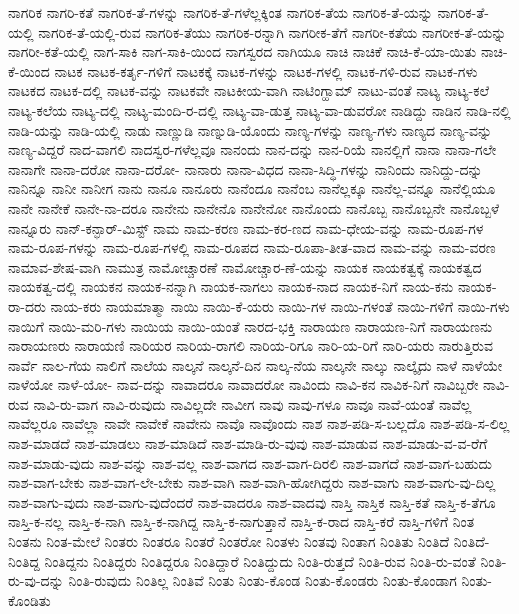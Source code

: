 {ನಾಗರಿಕ
ನಾಗರಿ-ಕತೆ
ನಾಗರಿಕ-ತೆ-ಗಳನ್ನು
ನಾಗರಿಕ-ತೆ-ಗಳೆಲ್ಲಕ್ಕಿಂತ
ನಾಗರಿಕ-ತೆಯ
ನಾಗರಿಕ-ತೆ-ಯನ್ನು
ನಾಗರಿಕ-ತೆ-ಯಲ್ಲಿ
ನಾಗರಿಕ-ತೆ-ಯಲ್ಲಿ-ರುವ
ನಾಗರಿಕ-ತೆಯು
ನಾಗರಿಕ-ರನ್ನಾಗಿ
ನಾಗರೀಕ-ತೆಗೆ
ನಾಗರೀ-ಕತೆಯ
ನಾಗರೀಕ-ತೆ-ಯನ್ನು
ನಾಗರೀ-ಕತೆ-ಯಲ್ಲಿ
ನಾಗ-ಸಾಕಿ
ನಾಗ-ಸಾಕಿ-ಯಿಂದ
ನಾಗಸ್ವರದ
ನಾಗಿಯೂ
ನಾಚಿ
ನಾಚಿಕೆ
ನಾಚಿ-ಕೆ-ಯಾ-ಯಿತು
ನಾಚಿ-ಕೆ-ಯಿಂದ
ನಾಟಕ
ನಾಟಕ-ಕರ್ತೃ-ಗಳಿಗೆ
ನಾಟಕಕ್ಕೆ
ನಾಟಕ-ಗಳನ್ನು
ನಾಟಕ-ಗಳಲ್ಲಿ
ನಾಟಕ-ಗಳಿ-ರುವ
ನಾಟಕ-ಗಳು
ನಾಟಕದ
ನಾಟಕ-ದಲ್ಲಿ
ನಾಟಕ-ವನ್ನು
ನಾಟಕವೇ
ನಾಟಕೀಯ-ವಾಗಿ
ನಾಟಿಂಗ್ಹಾಮ್
ನಾಟು-ವಂತೆ
ನಾಟ್ಯ
ನಾಟ್ಯ-ಕಲೆ
ನಾಟ್ಯ-ಕಲೆಯ
ನಾಟ್ಯ-ದಲ್ಲಿ
ನಾಟ್ಯ-ಮಂದಿ-ರ-ದಲ್ಲಿ
ನಾಟ್ಯ-ವಾ-ಡುತ್ತ
ನಾಟ್ಯ-ವಾ-ಡುವರೋ
ನಾಡಿದ್ದು
ನಾಡಿನ
ನಾಡಿ-ನಲ್ಲಿ
ನಾಡಿ-ಯನ್ನು
ನಾಡಿ-ಯಲ್ಲಿ
ನಾಡು
ನಾಣ್ಣುಡಿ
ನಾಣ್ನುಡಿ-ಯೊಂದು
ನಾಣ್ಯ-ಗಳನ್ನು
ನಾಣ್ಯ-ಗಳು
ನಾಣ್ಯದ
ನಾಣ್ಯ-ವನ್ನು
ನಾಣ್ಯ-ವಿದ್ದರೆ
ನಾದ-ವಾಗಲಿ
ನಾದಸ್ವರ-ಗಳೆಲ್ಲವೂ
ನಾನಂದು
ನಾನ-ದನ್ನು
ನಾನ-ರಿಯೆ
ನಾನಲ್ಲಿಗೆ
ನಾನಾ
ನಾನಾ-ಗಲೇ
ನಾನಾಗೇ
ನಾನಾ-ದರೋ
ನಾನಾ-ದರೋ-
ನಾನಾರು
ನಾನಾ-ವಿಧದ
ನಾನಾ-ಸಿದ್ಧಿ-ಗಳನ್ನು
ನಾನಿಂದು
ನಾನಿದ್ದು-ದನ್ನು
ನಾನಿನ್ನೂ
ನಾನೀ
ನಾನೀಗ
ನಾನು
ನಾನೂ
ನಾನೂರು
ನಾನೆಂದೂ
ನಾನೆಂಬ
ನಾನೆಲ್ಲಕ್ಕೂ
ನಾನೆಲ್ಲ-ವನ್ನೂ
ನಾನೆಲ್ಲಿಯೂ
ನಾನೇ
ನಾನೇಕೆ
ನಾನೇ-ನಾ-ದರೂ
ನಾನೇನು
ನಾನೇನೊ
ನಾನೇನೋ
ನಾನೊಂದು
ನಾನೊಬ್ಬ
ನಾನೊಬ್ಬನೇ
ನಾನೊಬ್ಬಳೆ
ನಾನ್ನೂರು
ನಾನ್-ಕನ್ಫಾರ್-ಮಿಸ್ಟ್
ನಾಮ
ನಾಮ-ಕರಣ
ನಾಮ-ಕರ-ಣದ
ನಾಮ-ಧೇಯ-ವನ್ನು
ನಾಮ-ರೂಪ-ಗಳ
ನಾಮ-ರೂಪ-ಗಳನ್ನು
ನಾಮ-ರೂಪ-ಗಳಲ್ಲಿ
ನಾಮ-ರೂಪದ
ನಾಮ-ರೂಪಾ-ತೀತ-ವಾದ
ನಾಮ-ವನ್ನು
ನಾಮ-ವರಣ
ನಾಮಾವ-ಶೇಷ-ವಾಗಿ
ನಾಮುತ್ರ
ನಾಮೋಚ್ಚಾರಣೆ
ನಾಮೋಚ್ಚಾರ-ಣೆ-ಯನ್ನು
ನಾಯಕ
ನಾಯಕತ್ವಕ್ಕೆ
ನಾಯಕತ್ವದ
ನಾಯಕತ್ವ-ದಲ್ಲಿ
ನಾಯಕನ
ನಾಯಕ-ನನ್ನಾಗಿ
ನಾಯಕ-ನಾಗಲು
ನಾಯಕ-ನಾದ
ನಾಯಕ-ನಿಗೆ
ನಾಯ-ಕನು
ನಾಯಕ-ರಾ-ದರು
ನಾಯ-ಕರು
ನಾಯಮಾತ್ಮಾ
ನಾಯಿ
ನಾಯಿ-ಕೆ-ಯರು
ನಾಯಿ-ಗಳ
ನಾಯಿ-ಗಳಂತೆ
ನಾಯಿ-ಗಳಿಗೆ
ನಾಯಿ-ಗಳು
ನಾಯಿಗೆ
ನಾಯಿ-ಮರಿ-ಗಳು
ನಾಯಿಯ
ನಾಯಿ-ಯಂತೆ
ನಾರದ-ಭಕ್ತಿ
ನಾರಾಯಣ
ನಾರಾಯಣ-ನಿಗೆ
ನಾರಾಯಣನು
ನಾರಾಯಣರು
ನಾರಾಯಣಿ
ನಾರಿಯರ
ನಾರಿಯ-ರಾಗಲಿ
ನಾರಿಯ-ರಿಗೂ
ನಾರಿ-ಯ-ರಿಗೆ
ನಾರಿ-ಯರು
ನಾರುತ್ತಿರುವ
ನಾರ್ವೆ
ನಾಲ-ಗೆಯ
ನಾಲಿಗೆ
ನಾಲೆಯ
ನಾಲ್ಕನೆ
ನಾಲ್ಕನೆ-ದಿನ
ನಾಲ್ಕ-ನೆಯ
ನಾಲ್ಕನೇ
ನಾಲ್ಕು
ನಾಲ್ಕೈದು
ನಾಳೆ
ನಾಳೆಯೇ
ನಾಳೆಯೋ
ನಾಳೆ-ಯೋ-
ನಾವ-ದನ್ನು
ನಾವಾದರೂ
ನಾವಾದರೋ
ನಾವಿಂದು
ನಾವಿ-ಕನ
ನಾವಿಕ-ನಿಗೆ
ನಾವಿಬ್ಬರೇ
ನಾವಿ-ರುವ
ನಾವಿ-ರು-ವಾಗ
ನಾವಿ-ರುವುದು
ನಾವಿಲ್ಲದೇ
ನಾವೀಗ
ನಾವು
ನಾವು-ಗಳೂ
ನಾವೂ
ನಾವೆ-ಯಂತೆ
ನಾವೆಲ್ಲ
ನಾವೆಲ್ಲರೂ
ನಾವೆಲ್ಲಾ
ನಾವೇ
ನಾವೇಕೆ
ನಾವೇನು
ನಾವೊ
ನಾವೊಂದು
ನಾಶ
ನಾಶ-ಪಡಿ-ಸ-ಬಲ್ಲದೊ
ನಾಶ-ಪಡಿ-ಸ-ಲಿಲ್ಲ
ನಾಶ-ಮಾಡದೆ
ನಾಶ-ಮಾಡಲು
ನಾಶ-ಮಾಡಿದೆ
ನಾಶ-ಮಾಡಿ-ರು-ವುವು
ನಾಶ-ಮಾಡುವ
ನಾಶ-ಮಾಡು-ವ-ವ-ರೆಗೆ
ನಾಶ-ಮಾಡು-ವುದು
ನಾಶ-ವನ್ನು
ನಾಶ-ವಲ್ಲ
ನಾಶ-ವಾಗದ
ನಾಶ-ವಾಗ-ದಿರಲಿ
ನಾಶ-ವಾಗದೆ
ನಾಶ-ವಾಗ-ಬಹುದು
ನಾಶ-ವಾಗ-ಬೇಕು
ನಾಶ-ವಾಗ-ಲೇ-ಬೇಕು
ನಾಶ-ವಾಗಿ
ನಾಶ-ವಾಗಿ-ಹೋಗಿದ್ದರು
ನಾಶ-ವಾಗು
ನಾಶ-ವಾಗು-ವು-ದಿಲ್ಲ
ನಾಶ-ವಾಗು-ವುದು
ನಾಶ-ವಾಗು-ವುದೆಂದರೆ
ನಾಶ-ವಾದರೂ
ನಾಶ-ವಾದವು
ನಾಸ್ತಿ
ನಾಸ್ತಿಕ
ನಾಸ್ತಿ-ಕತೆ
ನಾಸ್ತಿ-ಕ-ತೆಗೂ
ನಾಸ್ತಿ-ಕ-ನಲ್ಲ
ನಾಸ್ತಿ-ಕ-ನಾಗಿ
ನಾಸ್ತಿ-ಕ-ನಾಗಿದ್ದ
ನಾಸ್ತಿ-ಕ-ನಾಗುತ್ತಾನೆ
ನಾಸ್ತಿ-ಕ-ರಾದ
ನಾಸ್ತಿ-ಕರೆ
ನಾಸ್ತಿ-ಗಳಿಗೆ
ನಿಂತ
ನಿಂತನು
ನಿಂತ-ಮೇಲೆ
ನಿಂತರು
ನಿಂತರೂ
ನಿಂತರೆ
ನಿಂತರೋ
ನಿಂತಳು
ನಿಂತವು
ನಿಂತಾಗ
ನಿಂತಿತು
ನಿಂತಿದೆ
ನಿಂತಿದೆ-
ನಿಂತಿದ್ದ
ನಿಂತಿದ್ದನು
ನಿಂತಿದ್ದರು
ನಿಂತಿದ್ದರೂ
ನಿಂತಿದ್ದಾರೆ
ನಿಂತಿದ್ದುದು
ನಿಂತಿ-ರುತ್ತದೆ
ನಿಂತಿ-ರುವ
ನಿಂತಿ-ರು-ವಂತೆ
ನಿಂತಿ-ರು-ವು-ದನ್ನು
ನಿಂತಿ-ರುವುದು
ನಿಂತಿಲ್ಲ
ನಿಂತಿವೆ
ನಿಂತು
ನಿಂತು-ಕೊಂಡ
ನಿಂತು-ಕೊಂಡರು
ನಿಂತು-ಕೊಂಡಾಗ
ನಿಂತು-ಕೊಂಡಿತು
}
